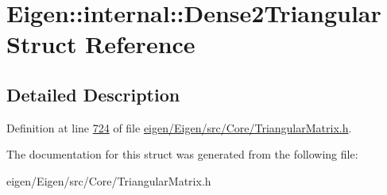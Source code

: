 \hypertarget{struct_eigen_1_1internal_1_1_dense2_triangular}{}\section{Eigen\+:\+:internal\+:\+:Dense2\+Triangular Struct Reference}
\label{struct_eigen_1_1internal_1_1_dense2_triangular}


\subsection{Detailed Description}


Definition at line \hyperlink{eigen_2_eigen_2src_2_core_2_triangular_matrix_8h_source_l00724}{724} of file \hyperlink{eigen_2_eigen_2src_2_core_2_triangular_matrix_8h_source}{eigen/\+Eigen/src/\+Core/\+Triangular\+Matrix.\+h}.



The documentation for this struct was generated from the following file\+:\begin{DoxyCompactItemize}
\item 
eigen/\+Eigen/src/\+Core/\+Triangular\+Matrix.\+h\end{DoxyCompactItemize}
